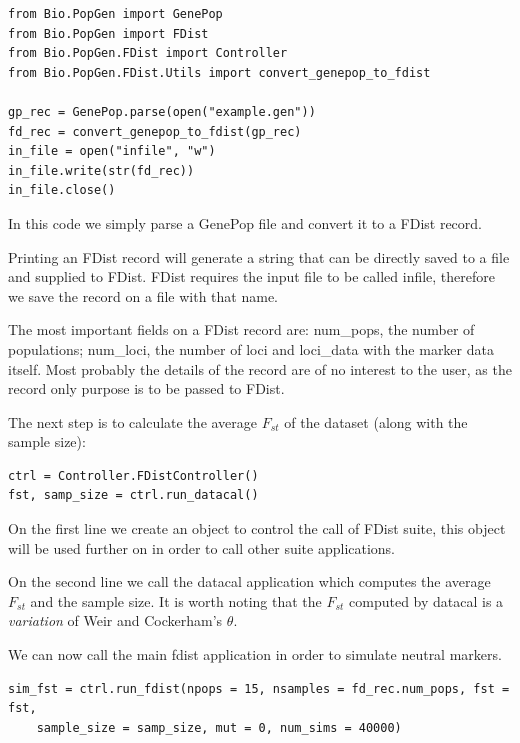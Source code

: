 \documentclass{report}
\begin{document}
\begin{verbatim}
from Bio.PopGen import GenePop
from Bio.PopGen import FDist
from Bio.PopGen.FDist import Controller
from Bio.PopGen.FDist.Utils import convert_genepop_to_fdist

gp_rec = GenePop.parse(open("example.gen"))
fd_rec = convert_genepop_to_fdist(gp_rec)
in_file = open("infile", "w")
in_file.write(str(fd_rec))
in_file.close()
\end{verbatim}

In this code we simply parse a GenePop file and convert it to a FDist
record.

Printing an FDist record will generate
a string that can be directly saved to a file and supplied to FDist. FDist
requires the input file to be called infile, therefore we save the record on
a file with that name.

The most important fields on a FDist record are: num\_pops, the number of
populations; num\_loci, the number of loci and loci\_data with the marker
data itself. Most probably the details of the record are of no interest
to the user, as the record only purpose is to be passed to FDist.

The next step is to calculate the average $F_{st}$ of the dataset (along
with the sample size):

\begin{verbatim}
ctrl = Controller.FDistController()
fst, samp_size = ctrl.run_datacal()
\end{verbatim}

On the first line we create an object to control the call of  FDist
suite, this object will be used further on in order to call other
suite applications.

On the second line we call the datacal application which computes the
average $F_{st}$
and the sample size. It is worth noting that the $F_{st}$ computed by
datacal is a \emph{variation} of Weir and Cockerham's $\theta$.

We can now call the main fdist application in order to simulate neutral
markers.

\begin{verbatim}
sim_fst = ctrl.run_fdist(npops = 15, nsamples = fd_rec.num_pops, fst = fst,
    sample_size = samp_size, mut = 0, num_sims = 40000)
\end{verbatim}
\end{document}
